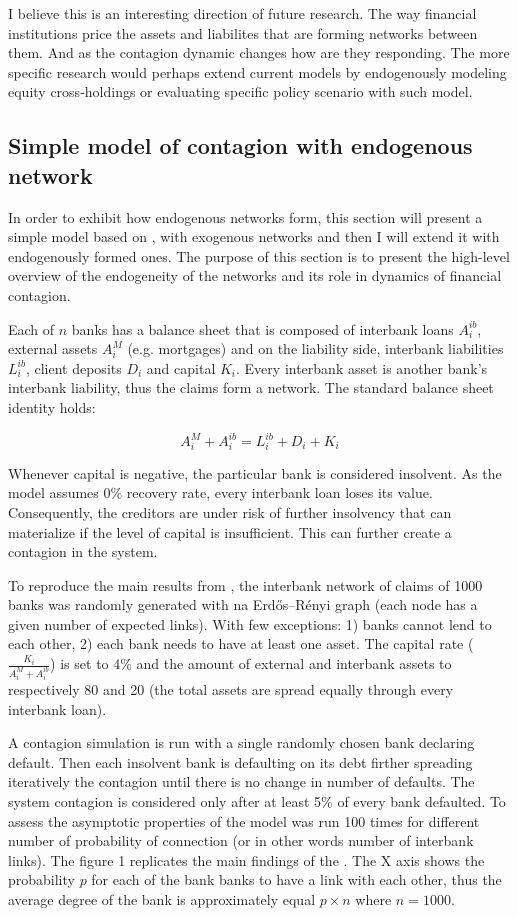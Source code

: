 \documentclass{article}
\begin{document}
I believe this is an interesting direction of future research. The way financial institutions price the assets and liabilites that are forming networks between them. And as the contagion dynamic changes how are they responding. The more specific research would perhaps extend current models by endogenously modeling equity cross-holdings or evaluating specific policy scenario with such model. 

\subsection*{Simple model of contagion with endogenous network}

In order to exhibit how endogenous networks form, this section will present a simple model based on \citet{gai}, with exogenous networks and then I will extend it with endogenously formed ones. The purpose of this section is to present the high-level overview of the endogeneity of the networks and its role in dynamics of financial contagion.

Each of $n$ banks has a balance sheet that is composed of interbank loans $A^{ib}_i$, external assets $A^{M}_i$ (e.g. mortgages) and on the liability side, interbank liabilities $L^{ib}_i$, client deposits $D_i$ and capital $K_i$. Every interbank asset is another bank's interbank liability, thus the claims form a network. The standard balance sheet identity holds:

$$A^{M}_i + A^{ib}_i = L^{ib}_i + D_i + K_i$$

Whenever capital is negative, the particular bank is considered insolvent. As the model assumes $0\%$ recovery rate, every interbank loan loses its value. Consequently, the creditors are under risk of further insolvency that can materialize if the level of capital is insufficient. This can further create a contagion in the system. 

To reproduce the main results from \citet{gai}, the interbank network of claims of 1000 banks was randomly generated with na Erdős–Rényi graph (each node has a given number of expected links). With few exceptions: 1) banks cannot lend to each other, 2) each bank needs to have at least one asset. The capital rate ($\frac{K_i}{A^{M}_i + A^{ib}_i}$) is set to $4\%$ and the amount of external and interbank assets to respectively 80 and 20 (the total assets are spread equally through every interbank loan). 

A contagion simulation is run with a single randomly chosen bank declaring default. Then each insolvent bank is defaulting on its debt firther spreading iteratively the contagion until there is no change in number of defaults. The system contagion is considered only after at least 5\% of every bank defaulted. To assess the asymptotic properties of the model was run 100 times for different number of probability of connection (or in other words number of interbank links). The figure 1 replicates the main findings of the \citet{gai}. The X axis shows the probability $p$ for each of the bank banks to have a link with each other, thus the average degree of the bank is approximately equal $p \times n$ where $n = 1000$. 
\end{document}
